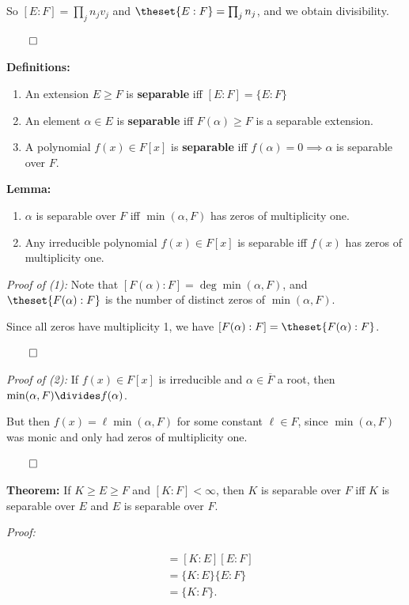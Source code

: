 So \([E: F] = \prod_j n_j v_j\) and \(\theset{E:F} = \prod_j n_j\), and
we obtain divisibility.

\(\qed\)

\textbf{Definitions:}

\begin{enumerate}
\def\labelenumi{\arabic{enumi}.}
\item
  An extension \(E \geq F\) is \textbf{separable} iff
  \([E:F] = \{E: F\}\)
\item
  An element \(\alpha \in E\) is \textbf{separable} iff
  \(F(\alpha) \geq F\) is a separable extension.
\item
  A polynomial \(f(x) \in F[x]\) is \textbf{separable} iff
  \(f(\alpha) = 0 \implies \alpha\) is separable over \(F\).
\end{enumerate}

\textbf{Lemma:}

\begin{enumerate}
\def\labelenumi{\arabic{enumi}.}
\item
  \(\alpha\) is separable over \(F\) iff \(\min(\alpha, F)\) has zeros
  of multiplicity one.
\item
  Any irreducible polynomial \(f(x) \in F[x]\) is separable iff \(f(x)\)
  has zeros of multiplicity one.
\end{enumerate}

\emph{Proof of (1):} Note that
\([F(\alpha): F] = \deg \min(\alpha, F)\), and \(\theset{F(\alpha): F}\)
is the number of distinct zeros of \(\min(\alpha, F)\).

Since all zeros have multiplicity 1, we have
\([F(\alpha): F] = \theset{F(\alpha): F}\).

\(\qed\)

\emph{Proof of (2):} If \(f(x) \in F[x]\) is irreducible and
\(\alpha\in \overline F\) a root, then
\(\min(\alpha, F) \divides f(\alpha)\).

But then \(f(x) = \ell \min(\alpha, F)\) for some constant
\(\ell \in F\), since \(\min(\alpha, F)\) was monic and only had zeros
of multiplicity one.

\(\qed\)

\textbf{Theorem:} If \(K \geq E \geq F\) and \([K:F] < \infty\), then
\(K\) is separable over \(F\) iff \(K\) is separable over \(E\) and
\(E\) is separable over \(F\).

\emph{Proof:}

\begin{align*}
[K: F]
&= [K:E] [E: F] \\
&= \{K:E\} \{E: F\} \\
&= \{K: F\}
.\end{align*}

